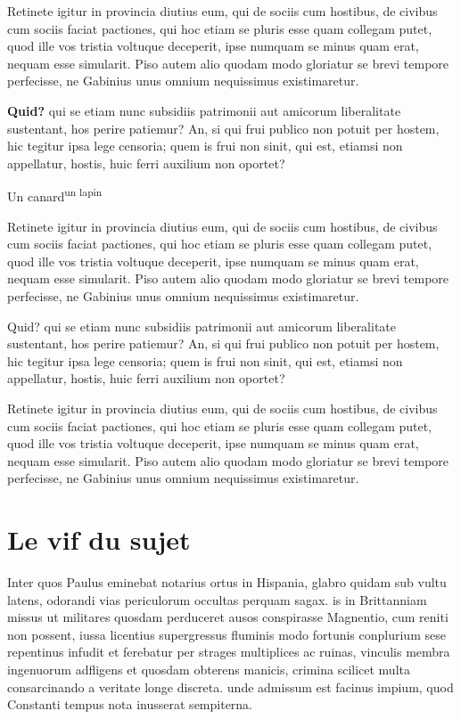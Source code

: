 \documentclass{report}
\begin{document}
Retinete igitur in provincia diutius eum, qui de sociis
cum hostibus, de civibus cum sociis faciat pactiones, qui hoc etiam se pluris esse
quam collegam putet, quod ille vos tristia voltuque deceperit, ipse numquam se minus
quam erat, nequam esse simularit. Piso autem alio quodam modo gloriatur se brevi
tempore perfecisse,
ne Gabinius unus omnium nequissimus existimaretur.


\textbf{Quid?} 
qui se etiam nunc subsidiis patrimonii aut amicorum liberalitate sustentant,
hos perire patiemur? An, si qui frui publico non potuit per hostem, hic tegitur ipsa
lege censoria; quem is frui non sinit, qui est, etiamsi non appellatur, hostis, huic
ferri auxilium non oportet?


{\LARGE Un canard\textsuperscript{un lapin} }


Retinete igitur in provincia diutius eum, qui de sociis
cum hostibus, de civibus cum sociis faciat pactiones, qui hoc etiam se pluris esse
quam collegam putet, quod ille vos tristia voltuque deceperit, ipse numquam se minus
quam erat, nequam esse simularit. Piso autem alio quodam modo gloriatur se brevi
tempore perfecisse,
ne Gabinius unus omnium nequissimus existimaretur.

Quid? qui se etiam nunc subsidiis patrimonii aut amicorum liberalitate sustentant,
hos perire patiemur? An, si qui frui publico non potuit per hostem, hic tegitur ipsa
lege censoria; quem is frui non sinit, qui est, etiamsi non appellatur, hostis, huic
ferri auxilium non oportet?

Retinete igitur in provincia diutius eum, qui de sociis
cum hostibus, de civibus cum sociis faciat pactiones, qui hoc etiam se pluris esse
quam collegam putet, quod ille vos tristia voltuque deceperit, ipse numquam se minus
quam erat, nequam esse simularit. Piso autem alio quodam modo gloriatur se brevi
tempore perfecisse,
ne Gabinius unus omnium nequissimus existimaretur.


\chapter{Le vif du sujet}


Inter quos Paulus eminebat notarius ortus in Hispania, glabro quidam sub vultu latens, odorandi vias periculorum occultas perquam sagax. is in Brittanniam missus ut militares quosdam perduceret ausos conspirasse Magnentio, cum reniti non possent, iussa licentius supergressus fluminis modo fortunis conplurium sese repentinus infudit et ferebatur per strages multiplices ac ruinas, vinculis membra ingenuorum adfligens et quosdam obterens manicis, crimina scilicet multa consarcinando a veritate longe discreta. unde admissum est facinus impium, quod Constanti tempus nota inusserat sempiterna.
\end{document}
